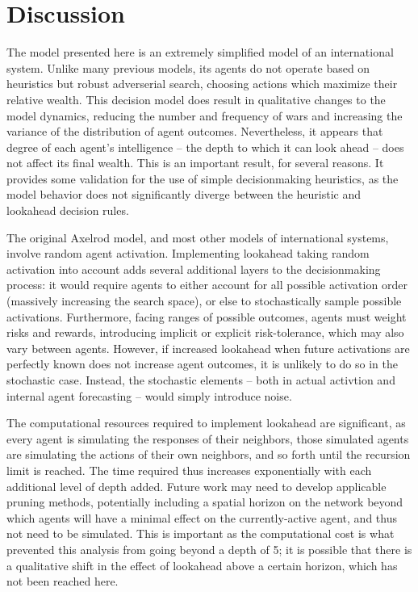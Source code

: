 \documentclass{article}
\begin{document}
\section{Discussion}

The model presented here is an extremely simplified model of an international system. Unlike many previous models, its agents do not operate based on heuristics but robust adverserial search, choosing actions which maximize their relative wealth. This decision model does result in qualitative changes to the model dynamics, reducing the number and frequency of wars and increasing the variance of the distribution of agent outcomes. Nevertheless, it appears that degree of each agent's intelligence -- the depth to which it can look ahead -- does not affect its final wealth. This is an important result, for several reasons. It provides some validation for the use of simple decisionmaking heuristics, as the model behavior does not significantly diverge between the heuristic and lookahead decision rules. 

The original Axelrod model, and most other models of international systems, involve random agent activation. Implementing lookahead taking random activation into account adds several additional layers to the decisionmaking process: it would require agents to either account for all possible activation order (massively increasing the search space), or else to stochastically sample possible activations. Furthermore, facing ranges of possible outcomes, agents must weight risks and rewards, introducing implicit or explicit risk-tolerance, which may also vary between agents. However, if increased lookahead when future activations are perfectly known does not increase agent outcomes, it is unlikely to do so in the stochastic case. Instead, the stochastic elements -- both in actual activtion and internal agent forecasting -- would simply introduce noise. 

The computational resources required to implement lookahead are significant, as every agent is simulating the responses of their neighbors, those simulated agents are simulating the actions of their own neighbors, and so forth until the recursion limit is reached. The time required thus increases exponentially with each additional level of depth added. Future work may need to develop applicable pruning methods, potentially including a spatial horizon on the network beyond which agents will have a minimal effect on the currently-active agent, and thus not need to be simulated. This is important as the computational cost is what prevented this analysis from going beyond a depth of 5; it is possible that there is a qualitative shift in the effect of lookahead above a certain horizon, which has not been reached here.
\end{document}
